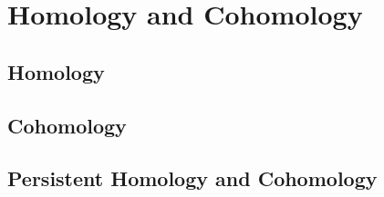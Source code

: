 \section{Homology and Cohomology} %
\label{sec:homology}

\subsection{Homology}

\subsection{Cohomology}

\subsection{Persistent Homology and Cohomology}

